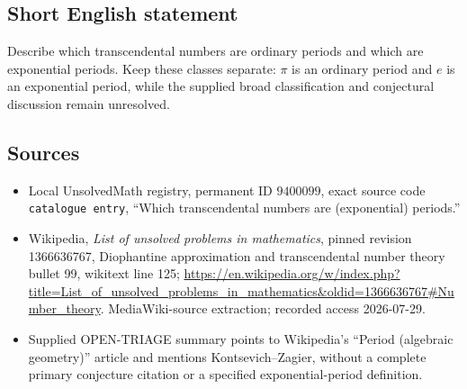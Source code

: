 \documentclass[11pt]{article}
\begin{document}
\subsection{Short English statement}
Describe which transcendental numbers are ordinary periods and which are exponential periods. Keep these classes separate: \(\pi\) is an ordinary period and \(e\) is an exponential period, while the supplied broad classification and conjectural discussion remain unresolved.
\subsection{Sources}
\begin{itemize}
\item Local UnsolvedMath registry, permanent ID \(9400099\), exact source code \texttt{catalogue entry}, ``Which transcendental numbers are (exponential) periods.''
\item Wikipedia, \emph{List of unsolved problems in mathematics}, pinned revision 1366636767, Diophantine approximation and transcendental number theory bullet 99, wikitext line 125; \url{https://en.wikipedia.org/w/index.php?title=List_of_unsolved_problems_in_mathematics&oldid=1366636767#Number_theory}. MediaWiki-source extraction; recorded access 2026-07-29.
\item Supplied OPEN-TRIAGE summary points to Wikipedia's ``Period (algebraic geometry)'' article and mentions Kontsevich--Zagier, without a complete primary conjecture citation or a specified exponential-period definition.
\end{itemize}
\end{document}
